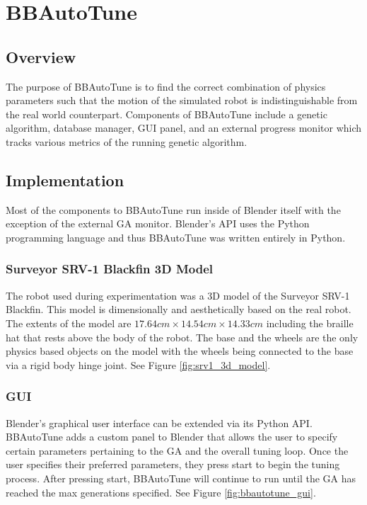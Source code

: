 \chapter{BBAutoTune}

\label{Chapter4}

\section{Overview}

The purpose of BBAutoTune is to find the correct combination of physics parameters such that the motion of the simulated robot is indistinguishable from the real world counterpart. Components of BBAutoTune include a genetic algorithm, database manager, GUI panel, and an external progress monitor which tracks various metrics of the running genetic algorithm.  

\section{Implementation}

Most of the components to BBAutoTune run inside of Blender itself with the exception of the external GA monitor. Blender's API uses the Python programming language and thus BBAutoTune was written entirely in Python. 

\subsection{Surveyor SRV-1 Blackfin 3D Model}

The robot used during experimentation was a 3D model of the Surveyor SRV-1 Blackfin. This model is dimensionally and aesthetically based on the real robot. The extents of the model are $17.64cm\times14.54cm\times14.33cm$ including the braille hat that rests above the body of the robot. The base and the wheels are the only physics based objects on the model with the wheels being connected to the base via a rigid body hinge joint. See Figure \ref{fig:srv1_3d_model}.

\subsection{GUI}

Blender's graphical user interface can be extended via its Python API. BBAutoTune adds a custom panel to Blender that allows the user to specify certain parameters pertaining to the GA and the overall tuning loop. Once the user specifies their preferred parameters, they press start to begin the tuning process. After pressing start, BBAutoTune will continue to run until the GA has reached the max generations specified. See Figure \ref{fig:bbautotune_gui}. 

